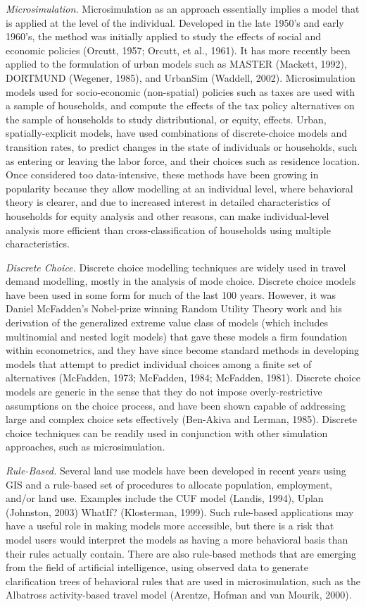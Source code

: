 \emph{Microsimulation.}  Microsimulation as an approach essentially implies a model that is applied at the level of the individual.  Developed in the late 1950's and early 1960's, the method was initially applied to study the effects of social and economic policies (Orcutt, 1957; Orcutt, et al., 1961).  It has more recently been applied to the formulation of urban models such as MASTER (Mackett, 1992), DORTMUND (Wegener, 1985), and UrbanSim (Waddell, 2002).  Microsimulation models used for socio-economic (non-spatial) policies such as taxes are used with a sample of households, and compute the effects of the tax policy alternatives on the sample of households to study distributional, or equity, effects.  Urban, spatially-explicit models, have used combinations of discrete-choice models and transition rates, to predict changes in the state of individuals or households, such as entering or leaving the labor force, and their choices such as residence location.  Once considered too data-intensive, these methods have been growing in popularity because they allow modelling at an individual level, where behavioral theory is clearer, and due to increased interest in detailed characteristics of households for equity analysis and other reasons, can make individual-level analysis more efficient than cross-classification of households using multiple characteristics.

\emph{Discrete Choice.}  Discrete choice modelling techniques are widely used in travel demand modelling, mostly in the analysis of mode choice.  Discrete choice models have been used in some form for much of the last 100 years.  However, it was Daniel McFadden's Nobel-prize winning Random Utility Theory work and his derivation of the generalized extreme value class of models (which includes multinomial and nested logit models) that gave these models a firm foundation within econometrics, and they have since become standard methods in developing models that attempt to predict individual choices among a finite set of alternatives (McFadden, 1973; McFadden, 1984; McFadden, 1981).  Discrete choice models are generic in the sense that they do not impose overly-restrictive assumptions on the choice process, and have been shown capable of addressing large and complex choice sets effectively (Ben-Akiva and Lerman, 1985).  Discrete choice techniques can be readily used in conjunction with other simulation approaches, such as microsimulation.

\emph{Rule-Based.}  Several land use models have been developed in recent years using GIS and a rule-based set of procedures to allocate population, employment, and/or land use.  Examples include the CUF model (Landis, 1994), Uplan (Johnston, 2003) WhatIf? (Klosterman, 1999).  Such rule-based applications may have a useful role in making models more accessible, but there is a risk that model users would interpret the models as having a more behavioral basis than their rules actually contain.  There are also rule-based methods that are emerging from the field of artificial intelligence, using observed data to generate clarification trees of behavioral rules that are used in microsimulation, such as the Albatross activity-based travel model (Arentze, Hofman and van Mourik, 2000).

